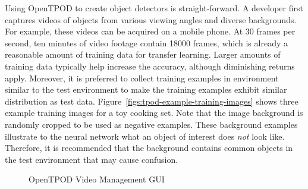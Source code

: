 Using OpenTPOD to create object detectors is straight-forward. A developer first
captures videos of objects from various viewing angles and diverse backgrounds.
For example, these videos can be acquired on a mobile phone. At 30 frames per
second, ten minutes of video footage contain 18000 frames, which is already a
reasonable amount of training data for transfer learning. Larger amounts of
training data typically help increase the accuracy, although diminishing returns
apply. Moreover, it is preferred to collect training examples in environment
similar to the test environment to make the training examples exhibit similar
distribution as test data. Figure~\ref{figs:tpod-example-training-images} shows
three example training images for a toy cooking set. Note that the image
background is randomly cropped to be used as negative examples. These
background examples illustrate to the neural network what an object of interest
does \textit{not} look like. Therefore, it is recommended that the background contains
common objects in the test environment that may cause confusion.


\begin{figure}[]
  \centering
  \caption{OpenTPOD Video Management GUI}
  \label{figs:tpod-video-gui}
\end{figure}

